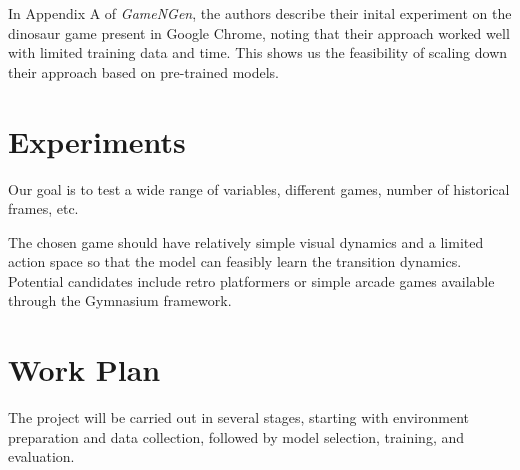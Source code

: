 \documentclass[twocolumn,a4paper]{article}
\begin{document}
In Appendix A of \textit{GameNGen}, the authors describe their inital experiment on the dinosaur game present in Google Chrome, noting that their approach worked well with limited training data and time. This shows us the feasibility of scaling down their approach based on pre-trained models.

\section{Experiments}

Our goal is to test a wide range of variables, different games, number of historical frames, etc.

The chosen game should have relatively simple visual dynamics and a limited action space so that the model can feasibly learn the transition dynamics. Potential candidates include retro platformers or simple arcade games available through the Gymnasium framework.


\section{Work Plan}

The project will be carried out in several stages, starting with environment preparation and data collection, followed by model selection, training, and evaluation.



\end{document}
